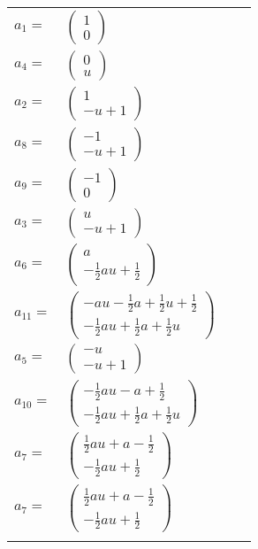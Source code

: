 \documentclass[1p]{elsarticle_modified}
\theoremstyle{definition}
\begin{document}
\begin{tabular}{m{7pt} m{180pt} m{7pt} m{180pt} }
\flushright $a_{1}=$&$\begin{pmatrix}1\\0\end{pmatrix}$ \\
\flushright $a_{4}=$&$\begin{pmatrix}0\\u\end{pmatrix}$ \\
\flushright $a_{2}=$&$\begin{pmatrix}1\\- u+1\end{pmatrix}$ \\
\flushright $a_{8}=$&$\begin{pmatrix}-1\\- u+1\end{pmatrix}$ \\
\flushright $a_{9}=$&$\begin{pmatrix}-1\\0\end{pmatrix}$ \\
\flushright $a_{3}=$&$\begin{pmatrix}u\\- u+1\end{pmatrix}$ \\
\flushright $a_{6}=$&$\begin{pmatrix}a\\-\frac{1}{2} a u+\frac{1}{2}\end{pmatrix}$ \\
\flushright $a_{11}=$&$\begin{pmatrix}- a u-\frac{1}{2} a+\frac{1}{2} u+\frac{1}{2}\\-\frac{1}{2} a u+\frac{1}{2} a+\frac{1}{2} u\end{pmatrix}$ \\
\flushright $a_{5}=$&$\begin{pmatrix}- u\\- u+1\end{pmatrix}$ \\
\flushright $a_{10}=$&$\begin{pmatrix}-\frac{1}{2} a u- a+\frac{1}{2}\\-\frac{1}{2} a u+\frac{1}{2} a+\frac{1}{2} u\end{pmatrix}$ \\
\flushright $a_{7}=$&$\begin{pmatrix}\frac{1}{2} a u+a-\frac{1}{2}\\-\frac{1}{2} a u+\frac{1}{2}\end{pmatrix}$\\ \flushright $a_{7}=$&$\begin{pmatrix}\frac{1}{2} a u+a-\frac{1}{2}\\-\frac{1}{2} a u+\frac{1}{2}\end{pmatrix}$\\&\end{tabular}
\end{document}

